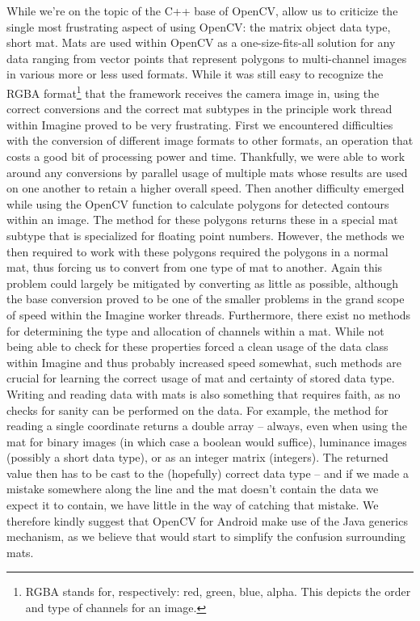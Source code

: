 While we're on the topic of the C++ base of OpenCV, allow us to criticize the single most frustrating aspect of using OpenCV: the matrix object data type, short mat.
Mats are used within OpenCV as a one-size-fits-all solution for any data ranging from vector points that represent polygons to multi-channel images in various more or less used formats.
While it was still easy to recognize the RGBA format\footnote{RGBA stands for, respectively: red, green, blue, alpha. This depicts the order and type of channels for an image.} that the framework receives the camera image in, using the correct conversions and the correct mat subtypes in the principle work thread within Imagine proved to be very frustrating.
First we encountered difficulties with the conversion of different image formats to other formats, an operation that costs a good bit of processing power and time.
Thankfully, we were able to work around any conversions by parallel usage of multiple mats whose results are used on one another to retain a higher overall speed.
Then another difficulty emerged while using the OpenCV function to calculate polygons for detected contours within an image.
The method for these polygons returns these in a special mat subtype that is specialized for floating point numbers.
However, the methods we then required to work with these polygons required the polygons in a normal mat, thus forcing us to convert from one type of mat to another.
Again this problem could largely be mitigated by converting as little as possible, although the base conversion proved to be one of the smaller problems in the grand scope of speed within the Imagine worker threads.
Furthermore, there exist no methods for determining the type and allocation of channels within a mat.
While not being able to check for these properties forced a clean usage of the data class within Imagine and thus probably increased speed somewhat, such methods are crucial for learning the correct usage of mat and certainty of stored data type.
Writing and reading data with mats is also something that requires faith, as no checks for sanity can be performed on the data.
For example, the method for reading a single coordinate returns a double array – always, even when using the mat for binary images (in which case a boolean would suffice), luminance images (possibly a short data type), or as an integer matrix (integers).
The returned value then has to be cast to the (hopefully) correct data type – and if we made a mistake somewhere along the line and the mat doesn't contain the data we expect it to contain, we have little in the way of catching that mistake.
We therefore kindly suggest that OpenCV for Android make use of the Java generics mechanism, as we believe that would start to simplify the confusion surrounding mats.

